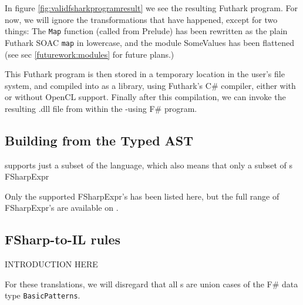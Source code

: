In figure \ref{fig:validfsharkprogramresult} we see the resulting Futhark program.
For now, we will ignore the transformations that have happened, except for two
things: The \texttt{Map} function (called from \fshark{}Prelude) has been rewritten
as the plain Futhark SOAC \texttt{map} in lowercase, and the module SomeValues has been
flattened (see sec \ref{futurework:modules} for future plans.)

This Futhark program is then stored in a temporary location in the user's file
system, and compiled into as a library, using Futhark's C\# compiler, either
with or without OpenCL support. Finally after this compilation, we can invoke
the resulting .dll file from within the \fshark{}-using F\# program.

\subsection{Building \fshark{} from the Typed AST}
\label{sec:fsharkcompilerrules}
\fshark{} supports just a subset of the \fsharp{} language, which also means that only a
subset of \fsharp{}s FSharpExpr

Only the supported FSharpExpr's has been listed here, but the full range of
FSharpExpr's are available on \cite{typedtree}.

\subsection{FSharp-to-\fshark{}IL rules}
INTRODUCTION HERE

For these translations, we will disregard that all \fsharpexpr{}s are union
cases of the F\# data type \texttt{BasicPatterns}.

